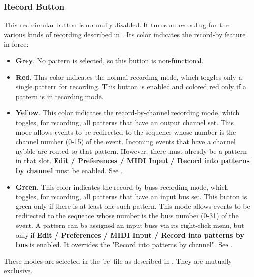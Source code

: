 \subsubsection{Record Button}
\label{subsubsec:introduction_record_button}

   This red circular button is normally disabled.
   It turns on recording for the various kinds of recording
   described in .
   Its color indicates the record-by feature in force:

   \begin{itemize}
      \item \textbf{Grey}.
         No pattern is selected, so this button is non-functional.
      \item \textbf{Red}.
         This color indicates the normal recording mode, which toggles only a
         single pattern for recording.
         This button is enabled and colored red only if a pattern is
         in recording mode.
      \item \textbf{Yellow}.
         This color indicates the record-by-channel recording mode,
         which toggles, for recording, all patterns that have an
         output channel set.
         This mode allows events to be redirected to the sequence
         whose number is the channel number (0-15) of the event.
         Incoming events that have a channel nybble are routed to that
         pattern.
         However, there must already be a pattern in that slot.
         \textbf{Edit / Preferences / MIDI Input / Record into patterns by
         channel}
         must be enabled.
         See .
      \item \textbf{Green}.
         This color indicates the record-by-buss recording mode,
         which toggles, for recording, all patterns that have an
         input bus set. This button is green only if there is at least
         one such pattern.
         This mode allows events to be redirected to the
         sequence whose number is the
         buss number (0-31) of the event.
         A pattern can be assigned an input buss via its right-click
         menu, but only if
         \textbf{Edit / Preferences / MIDI Input / Record into patterns by bus}
         is enabled.
         It overrides the "Record into patterns by channel".
         See .
   \end{itemize}

   These modes are selected in the 'rc' file as described in
   .
   They are mutually exclusive.


